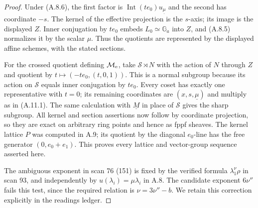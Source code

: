 \begin{proof}
Under (A.8.6), the first factor is
$\operatorname{Int}(t e_0)u_{\underline\mu}$ and the second has
coordinate $-s$. The kernel of the effective projection is the
$s$-axis; its image is the displayed $Z$. Inner conjugation by
$t e_0$ embeds $L_0\simeq\mathbb G_a$ into $Z$, and (A.8.5)
normalizes it by the scalar $\mu$. Thus the quotients are represented
by the displayed affine schemes, with the stated sections.

For the crossed quotient defining $\mathcal M_{\rm e}$, take
$\mathcal S\rtimes N$ with the action of $N$ through $Z$ and quotient
by $t\mapsto(-t e_0,(t,0,1))$. This is a normal subgroup because
its action on $\mathcal S$ equals inner conjugation by $t e_0$.
Every coset has exactly one representative with $t=0$; its remaining
coordinates are $(x,s,\underline\mu)$ and multiply as in (A.11.1).
The same calculation with $\underline M$ in place of $\mathcal S$
gives the sharp subgroup. All kernel and section assertions now
follow by coordinate projection, so they are exact on arbitrary
ring points and hence as fppf sheaves. The kernel lattice $P$ was
computed in A.9; its quotient by the diagonal $e_0$-line has the
free generator $(0,e_0+e_1)$. This proves every lattice and
vector-group sequence asserted here.

The ambiguous exponent in scan 76 (151) is fixed by the verified
formula $\lambda_1^{\nu}\rho$ in scan 93, and independently by
$u(\lambda_i)=\mu\lambda_i$ in A.8. The candidate exponent
$6\nu''$ fails this test, since the required relation is
$\nu=3\nu''-b$. We retain this correction explicitly in the
readings ledger.
\end{proof}

